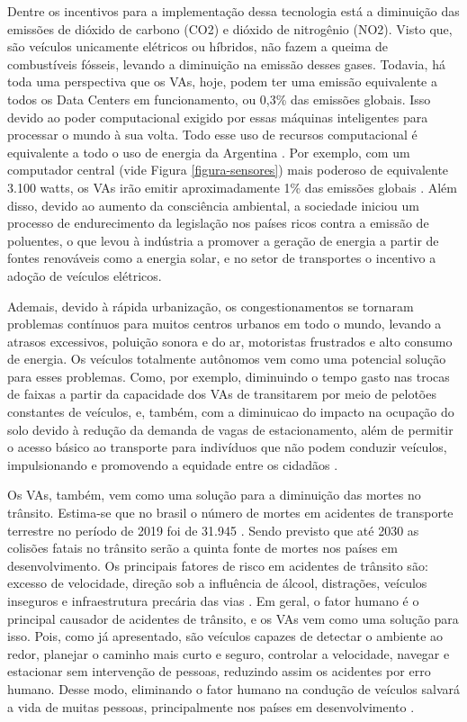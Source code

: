 \documentclass[
	12pt,				%
	openany, %
	a4paper,			%
	english,			%
	french,				%
	spanish,			%
	brazil				%
	]{abntex2}
\begin{document}
Dentre os incentivos para a implementação dessa tecnologia está a diminuição das emissões de dióxido de carbono (CO2) e dióxido de nitrogênio (NO2). Visto que, são veículos unicamente elétricos ou híbridos, não fazem a queima de combustíveis fósseis, levando a diminuição na emissão desses gases. Todavia, há toda uma perspectiva que os VAs, hoje, podem ter uma emissão equivalente a todos os Data Centers em funcionamento, ou 0,3\% das emissões globais. Isso devido ao poder computacional exigido por essas máquinas inteligentes para processar o mundo à sua volta. Todo esse uso de recursos computacional é equivalente a todo o uso de energia da Argentina \cite{intro-pm}. Por exemplo, com um computador central (vide Figura \ref{figura-sensores}) mais poderoso de equivalente 3.100 watts, os VAs irão emitir aproximadamente 1\% das emissões globais \cite{intro-pm}.
Além disso, devido ao aumento da consciência ambiental, a sociedade iniciou um processo de endurecimento da legislação nos países ricos contra a emissão de poluentes, o que levou à indústria a promover a geração de energia a partir de fontes renováveis como a energia solar, e no setor de transportes o incentivo a adoção de veículos elétricos.

Ademais, devido à rápida urbanização, os congestionamentos se tornaram problemas contínuos para muitos centros urbanos em todo o mundo, levando a atrasos excessivos, poluição sonora e do ar, motoristas frustrados e alto consumo de energia. Os veículos totalmente autônomos vem como uma potencial solução para esses problemas. Como, por exemplo, diminuindo o tempo gasto nas trocas de faixas a partir da capacidade dos VAs de transitarem por meio de pelotões constantes de veículos, e, também, com a diminuicao do impacto na ocupação do solo devido à redução da demanda de vagas de estacionamento, além de permitir o acesso básico ao transporte para indivíduos que não podem conduzir veículos, impulsionando e promovendo a equidade entre os cidadãos \cite{conge}.

Os VAs, também, vem como uma solução para a diminuição das mortes no trânsito. Estima-se que no brasil o número de mortes em acidentes de transporte terrestre no período de 2019 foi de 31.945 \cite{Anexo_I_pnatrans}. Sendo previsto que até 2030 as colisões fatais no trânsito serão a quinta fonte de mortes nos países em desenvolvimento. 
Os principais fatores de risco em acidentes de trânsito são: excesso de velocidade, direção sob a influência de álcool, distrações, veículos inseguros e infraestrutura precária das vias \cite{review-auto}.
Em geral, o fator humano é o principal causador de acidentes de trânsito, e os VAs vem como uma solução para isso. Pois, como já apresentado, são veículos capazes de detectar o ambiente ao redor, planejar o caminho mais curto e seguro, controlar a velocidade, navegar e estacionar sem intervenção de pessoas, reduzindo assim os acidentes por erro humano.
Desse modo, eliminando o fator humano na condução de veículos salvará a vida de muitas pessoas, principalmente nos países em desenvolvimento \cite{mundobrasil}. 
\end{document}
